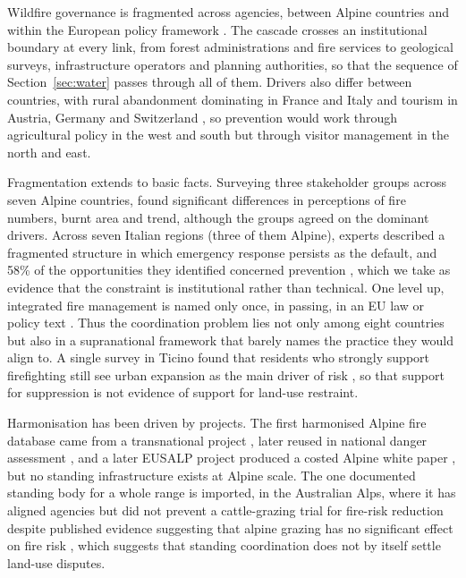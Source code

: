 \documentclass[11pt,a4paper]{article}
\begin{document}
Wildfire governance is fragmented across agencies, between Alpine countries and within the European policy framework \citep{kirschner_governance_2024, hoang_stakeholders_2026, plana_framing_2024, bardsley_wildfire_2021}. The cascade crosses an institutional boundary at every link, from forest administrations and fire services to geological surveys, infrastructure operators and planning authorities, so that the sequence of Section~\ref{sec:water} passes through all of them. Drivers also differ between countries, with rural abandonment dominating in France and Italy and tourism in Austria, Germany and Switzerland \citep{muller_forest_2020}, so prevention would work through agricultural policy in the west and south but through visitor management in the north and east.

Fragmentation extends to basic facts. Surveying three stakeholder groups across seven Alpine countries, \citet{hoang_stakeholders_2026} found significant differences in perceptions of fire numbers, burnt area and trend, although the groups agreed on the dominant drivers. Across seven Italian regions (three of them Alpine), experts described a fragmented structure in which emergency response persists as the default, and 58\% of the opportunities they identified concerned prevention \citep{kirschner_governance_2024}, which we take as evidence that the constraint is institutional rather than technical. One level up, integrated fire management is named only once, in passing, in an EU law or policy text \citep{plana_framing_2024}. Thus the coordination problem lies not only among eight countries but also in a supranational framework that barely names the practice they would align to. A single survey in Ticino found that residents who strongly support firefighting still see urban expansion as the main driver of risk \citep{bardsley_wildfire_2021}, so that support for suppression is not evidence of support for land-use restraint.

Harmonisation has been driven by projects. The first harmonised Alpine fire database came from a transnational project \citep{valese_wildfires_2011}, later reused in national danger assessment \citep{muller_towards_2020}, and a later EUSALP project produced a costed Alpine white paper \citep{muller_forest_2020}, but no standing infrastructure exists at Alpine scale. The one documented standing body for a whole range is imported, in the Australian Alps, where it has aligned agencies but did not prevent a cattle-grazing trial for fire-risk reduction despite published evidence suggesting that alpine grazing has no significant effect on fire risk \citep{lockwood_biodiversity_2014}, which suggests that standing coordination does not by itself settle land-use disputes.
\end{document}
